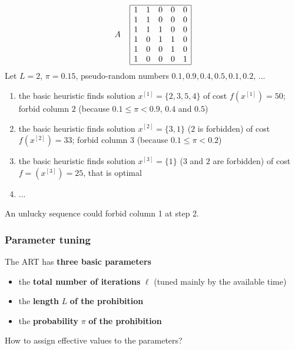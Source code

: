 \documentclass[11pt]{article}
\begin{document}
	$$
	A \;\;\;\;
	\begin{array}{| c c c c c |}
		\hline
		1 & 1 & 0 & 0 & 0 \\
		1 & 1 & 0 & 0 & 0 \\
		1 & 1 & 1 & 0 & 0 \\
		1 & 0 & 1 & 1 & 0 \\
		1 & 0 & 0 & 1 & 0 \\
		1 & 0 & 0 & 0 & 1 \\
		\hline
	\end{array}
	$$
	Let $L = 2$, $\pi = 0.15$, pseudo-random numbers $0.1, 0.9, 0.4, 0.5, 0.1, 0.2, \, ...$
	\begin{enumerate}
		\item the basic heuristic finds solution $x^{[1]} = \{2, 3, 5, 4\}$ of cost $f \left(x^{[1]}\right) = 50$; forbid column $2$ (because $0.1 \leq \pi < 0.9$, $0.4$ and $0.5$)
		
		\item the basic heuristic finds solution $x^{[2]} = \{3, 1\}$ ($2$ is forbidden) of cost $f \left(x^{[2]}\right) = 33$; forbid column $3$ (because $0.1 \leq \pi < 0.2$)
		
		\item the basic heuristic finds solution $x^{[3]} = \{1\}$ ($3$ and $2$ are forbidden) of cost $f = \left(x^{[3]}\right) = 25$, that is optimal
		
		\item ...
	\end{enumerate}
	An unlucky sequence could forbid column 1 at step 2.\\
	
	\newpage
	
	\subsubsection{Parameter tuning}
	The ART has \textbf{three basic parameters}
	\begin{itemize}
		\item the \textbf{total number of iterations} $\ell$ (tuned mainly by the available time)
		\item the \textbf{length} $L$ \textbf{of the prohibition}
		\item the \textbf{probability} $\pi$ \textbf{of the prohibition}
	\end{itemize}
	
	How to assign effective values to the parameters? \\
	
\end{document}

